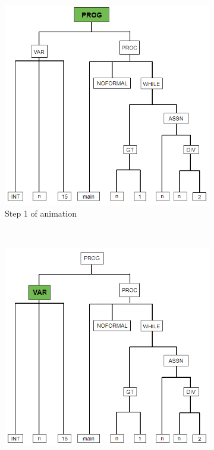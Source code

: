 \documentclass{l4proj}
\begin{document}
\begin{figure}[h]
	\centering
	\begin{subfigure}[b]{0.3\textwidth}
		\includegraphics[width=\linewidth]{images/animation-active-wireframe.png}
		\caption{Step 1 of animation}
		\label{fig:anim-step-1}
	\end{subfigure}
	~
	\begin{subfigure}[b]{0.3\textwidth}
		\includegraphics[width=\linewidth]{images/animation-active-wireframe2.png}

\end{subfigure}
\end{figure}
\end{document}
